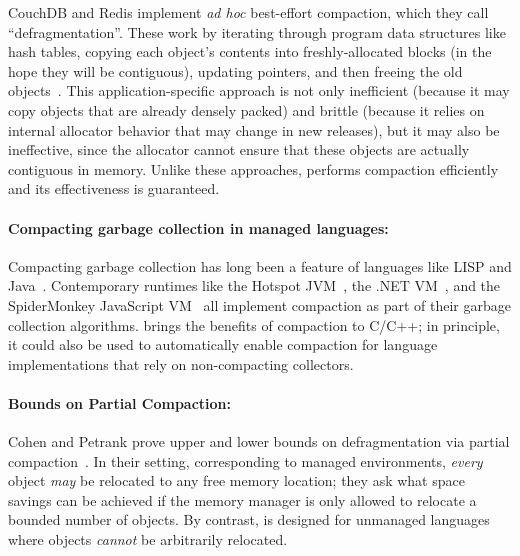 CouchDB and Redis implement \emph{ad hoc} best-effort compaction,
which they call ``defragmentation''.  These work by iterating through
program data structures like hash tables, copying each object's
contents into freshly-allocated blocks (in the hope they will be
contiguous), updating pointers, and then freeing the old
objects~\cite{jemalloc:exposehints,redis:announcement}. This
application-specific approach is not only inefficient (because it may
copy objects that are already densely packed) and brittle (because it
relies on internal allocator behavior that may change in new
releases), but it may also be ineffective, since the allocator cannot
ensure that these objects are actually contiguous in memory. Unlike
these approaches, \Mesh performs compaction efficiently and its
effectiveness is guaranteed.

\paragraph{Compacting garbage collection in managed languages:}
Compacting garbage collection has long been a feature of languages
like LISP and
Java~\cite{hansen:1969:compaction,fenichel:1969:compaction}. Contemporary
runtimes like the Hotspot JVM~\cite{microystems2006memory}, the .NET
VM~\cite{microsoft:dotnet-gc}, and the SpiderMonkey JavaScript
VM~\cite{mozilla:spidermonkey-compaction} all implement compaction as
part of their garbage collection algorithms. \Mesh{} brings the
benefits of compaction to C/C++; in principle, it could also be used
to automatically enable compaction for language implementations that
rely on non-compacting collectors.

\paragraph{Bounds on Partial Compaction:}
Cohen and Petrank prove upper and lower bounds on defragmentation via
partial compaction~\cite{Cohen:2017:LPC:3050768.2994597,
  Cohen:2013:LPC:2491956.2491973}. In their setting, corresponding to
managed environments, \emph{every} object \emph{may} be relocated to
any free memory location; they ask what space savings can be achieved
if the memory manager is only allowed to relocate a bounded number of
objects. By contrast, \Mesh{} is designed for unmanaged languages
where objects \emph{cannot} be arbitrarily relocated.

